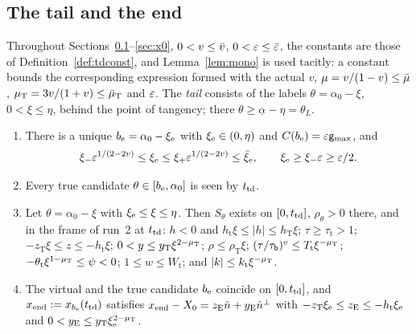 
\subsection{The tail and the end}\label{sec:tail}

Throughout Sections~\ref{sec:tail}--\ref{sec:x0}, $0<v\le\bar v$, $0<\varepsilon\le\bar\varepsilon$, the constants are those of
Definition~\ref{def:tdconst}, and Lemma~\ref{lem:mono} is used tacitly: a constant bounds the corresponding expression formed with
the actual $v$, $\mu=v/(1-v)\le\bar\mu$, $\mu_{\mathrm T}=3v/(1+v)\le\bar\mu_{\mathrm T}$ and $\varepsilon$. The \emph{tail} consists of the labels
$\theta=\alpha_0-\xi$, $0<\xi\le\eta$, behind the point of tangency; there $\theta\ge\underline\alpha-\eta=\theta_L$.

\begin{lemma}\label{lem:tail}
\begin{enumerate}
\item[(a)] There is a unique $b_{\mathrm e}=\alpha_0-\xi_{\mathrm e}$ with $\xi_{\mathrm e}\in(0,\eta)$ and $C(b_{\mathrm e})=\varepsilon\mathsf g_{\max}$, and
\[
\xi_-\varepsilon^{1/(2-2v)}\le\xi_{\mathrm e}\le\xi_+\varepsilon^{1/(2-2v)}\le\bar\xi_{\mathrm e},\qquad\xi_{\mathrm e}\ge\xi_-\varepsilon\ge\varepsilon/2 .
\]
\item[(b)] Every true candidate $\theta\in[b_{\mathrm e},\alpha_0]$ is seen by $t_{\mathrm{td}}$.
\item[(c)] Let $\theta=\alpha_0-\xi$ with $\xi_{\mathrm e}\le\xi\le\eta$. Then $S_\theta$ exists on $[0,t_{\mathrm{td}}]$, $\rho_\theta>0$ there, and in the
frame of run~2 at $t_{\mathrm{td}}$:
$h<0$ and $h_{\mathrm t}\xi\le|h|\le h_{\mathrm T}\xi$; $\tau\ge\tau_{\mathrm t}>1$; $-z_{\mathrm T}\xi\le z\le-h_{\mathrm t}\xi$;
$0<y\le y_{\mathrm T}\xi^{2-\mu_{\mathrm T}}$; $\rho\le\rho_{\mathrm T}\xi$; $(\tau/\tau_{\mathsf b})^v\le T_{\mathrm t}\xi^{-\mu_{\mathrm T}}$;
$-\theta_{\mathrm t}\xi^{1-\mu_{\mathrm T}}\le\psi<0$; $1\le w\le W_{\mathrm t}$; and $|k|\le k_{\mathrm t}\xi^{-\mu_{\mathrm T}}$.
\item[(d)] The virtual and the true candidate $b_{\mathrm e}$ coincide on $[0,t_{\mathrm{td}}]$, and $x_{\mathrm{end}}:=x_{b_{\mathrm e}}(t_{\mathrm{td}})$ satisfies
$x_{\mathrm{end}}-X_0=z_{\mathrm E}\hat n+y_{\mathrm E}\hat n^\perp$ with $-z_{\mathrm T}\xi_{\mathrm e}\le z_{\mathrm E}\le-h_{\mathrm t}\xi_{\mathrm e}$ and
$0<y_{\mathrm E}\le y_{\mathrm T}\xi_{\mathrm e}^{2-\mu_{\mathrm T}}$.
\end{enumerate}
\end{lemma}

